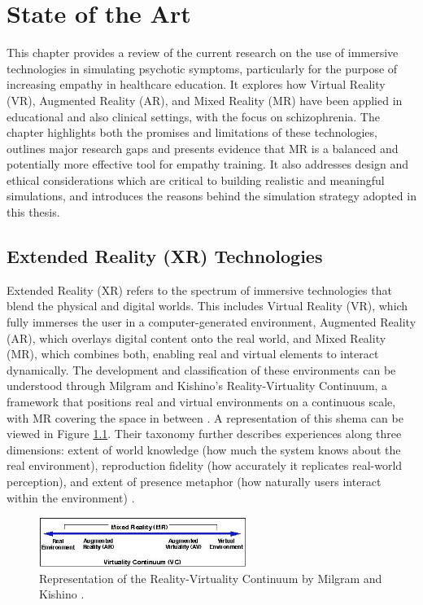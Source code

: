 \chapter{State of the Art}
\label{ch:background}

This chapter provides a review of the current research on the use of immersive technologies in simulating psychotic symptoms, particularly for the purpose of increasing empathy in healthcare education. It explores how Virtual Reality (VR), Augmented Reality (AR), and Mixed Reality (MR) have been applied in educational and also clinical settings, with the focus on schizophrenia. The chapter highlights both the promises and limitations of these technologies, outlines major research gaps and presents evidence that MR is a balanced and potentially more effective tool for empathy training. It also addresses design and ethical considerations which are critical to building realistic and meaningful simulations, and introduces the reasons behind the simulation strategy adopted in this thesis.

\section{Extended Reality (XR) Technologies}
Extended Reality (XR) refers to the spectrum of immersive technologies that blend the physical and digital worlds. This includes Virtual Reality (VR), which fully immerses the user in a computer-generated environment, Augmented Reality (AR), which overlays digital content onto the real world, and Mixed Reality (MR), which combines both, enabling real and virtual elements to interact dynamically. The development and classification of these environments can be understood through Milgram and Kishino’s Reality-Virtuality Continuum, a framework that positions real and virtual environments on a continuous scale, with MR covering the space in between \cite{milgram1994}. A representation of this shema can be viewed in Figure \ref{fig:milgram}. Their taxonomy further describes experiences along three dimensions: extent of world knowledge (how much the system knows about the real environment), reproduction fidelity (how accurately it replicates real-world perception), and extent of presence metaphor (how naturally users interact within the environment) \cite{Skarbez2021}. 

\vspace{1em}

\begin{figure}[h!] 
    \centering 
    \includegraphics[width=0.6\textwidth]{../../Figures/milgram.jpeg} 
    \caption{Representation of the Reality-Virtuality Continuum by Milgram and Kishino \cite{milgram1994}.} 
    \label{fig:milgram} 
\end{figure}

